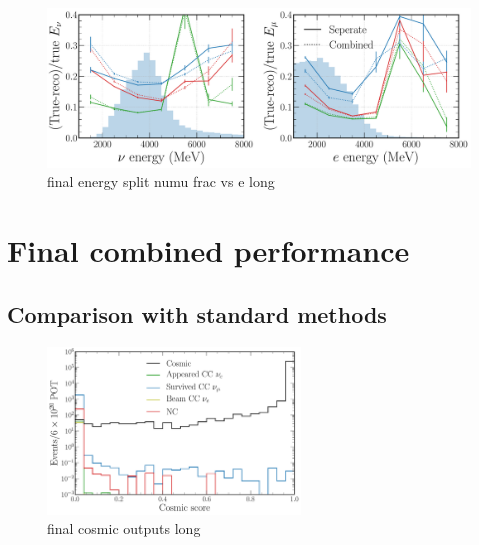 \begin{figure} %
    \includegraphics[width=\textwidth]{diagrams/6-cvn/chipsnet/final_energy_split_numu_frac_vs_e.pdf}
    \caption[final energy split numu frac vs e short]
    {final energy split numu frac vs e long}
    \label{fig:final_energy_split_numu_frac_vs_e}
\end{figure}

\section{Final combined performance} %
\label{sec:cvn_final} %

\subsection{Comparison with standard methods} %
\label{sec:cvn_final_comparison} %






\begin{figure} %
    \includegraphics[width=0.6\textwidth]{diagrams/6-cvn/chipsnet/final_cosmic_outputs.pdf}
    \caption[final cosmic outputs short]
    {final cosmic outputs long}
    \label{fig:final_cosmic_outputs}
\end{figure}


